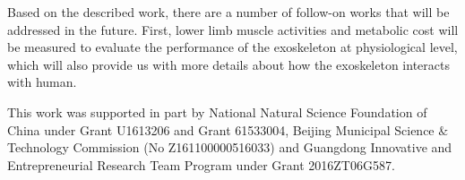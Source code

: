 \documentclass[twocolumn,cleanfoot,10pt]{asme2ej}
\begin{document}
Based on the described work, there are a number of follow-on works that will be addressed in the future. First, lower limb muscle activities and metabolic cost will be measured to evaluate the performance of the exoskeleton at physiological level, which will also provide us with more details about how the exoskeleton interacts with human. 

\begin{acknowledgment}
This work was supported in part by National Natural Science Foundation of China under Grant U1613206 and Grant 61533004, Beijing Municipal Science $\&$ Technology Commission (No Z161100000516033) and Guangdong Innovative and Entrepreneurial Research Team Program under Grant 2016ZT06G587.
\end{acknowledgment}

%



%


\clearpage
\listoffigures
\clearpage
\listoftables
\end{document}
